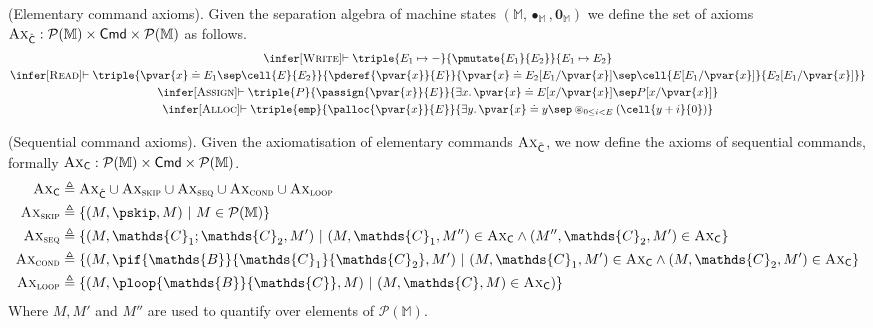 \param (Elementary command axioms). Given the separation algebra of machine states $(\mathbb{M}, \bullet_\mathbb{M}, \mathbf{0}_\mathbb{M})$ we define the set of axioms $\textsc{Ax}_{\hat{\mathsf{C}}} : \mathcal{P}(\mathbb{M}) \times \mathsf{Cmd} \times \mathcal{P}(\mathbb{M})$ as follows.
\begin{gather*}
	\infer[\textsc{Write}]
	{
		\vdash
		\triple
			{E_1 \mapsto -}
			{\pmutate{E_1}{E_2}}
			{E_1 \mapsto E_2}
	}
	{}
	\\
	\infer[\textsc{Read}]
	{
		\vdash
		\triple
			{\pvar{x} \doteq E_1 \sep \cell{E}{E_2}}
			{\pderef{\pvar{x}}{E}}
			{\pvar{x} \doteq E_2[E_1/\pvar{x}] \sep \cell{E[E_1/\pvar{x}]}{E_2[E_1/\pvar{x}]}}
	}
	{}
	\\
	\infer[\textsc{Assign}]
	{
		\vdash
		\triple
			{P}
			{\passign{\pvar{x}}{E}}
			{\exists x \ldotp \pvar{x} \doteq E[x/\pvar{x}] \sep P[x/\pvar{x}]}	
	}
	{}
	\\
	\infer[\textsc{Alloc}]
	{
		\vdash
		\triple
			{\mathtt{emp}}
			{\palloc{\pvar{x}}{E}}
			{\exists y \ldotp \pvar{x} \doteq y \sep \circledast_{0 \leq i < E} \left(\cell{y + i}{0}\right)}
	}
	{}
\end{gather*}

\param (Sequential command axioms). Given the axiomatisation of elementary commands $\textsc{Ax}_{\hat{\mathsf{C}}}$, we now define the axioms of sequential commands, formally $\textsc{Ax}_\mathsf{C} : \mathcal{P}(\mathbb{M}) \times \mathsf{Cmd} \times \mathcal{P}(\mathbb{M})$.
\begin{align*}
	\textsc{Ax}_\mathsf{C} &\triangleq \textsc{Ax}_{\hat{\mathsf{C}}} \cup \textsc{Ax}_{\textsc{skip}} \cup \textsc{Ax}_{\textsc{seq}} \cup \textsc{Ax}_{\textsc{cond}} \cup \textsc{Ax}_{\textsc{loop}}
	\\
	\textsc{Ax}_{\textsc{skip}} &\triangleq \{ (M, \pskip, M)\ |\ M \in \mathcal{P}(\mathbb{M}) \}
	\\
	\textsc{Ax}_{\textsc{seq}} &\triangleq \{ (M, \mathds{C}_1 ; \mathds{C}_2, M')\ |\ (M, \mathds{C}_1, M'') \in \textsc{Ax}_\mathsf{C} \land (M'', \mathds{C}_2, M') \in \textsc{Ax}_\mathsf{C} \}
	\\
	\textsc{Ax}_{\textsc{cond}} &\triangleq \{ (M, \pif{\mathds{B}}{\mathds{C}_1}{\mathds{C}_2}, M')\ |\ (M, \mathds{C}_1, M') \in \textsc{Ax}_\mathsf{C} \land (M, \mathds{C}_2, M') \in \textsc{Ax}_\mathsf{C} \}
	\\
	\textsc{Ax}_{\textsc{loop}} &\triangleq \{ (M, \ploop{\mathds{B}}{\mathds{C}}, M)\ |\ (M, \mathds{C}, M) \in \textsc{Ax}_\mathsf{C}) \}
\end{align*}
Where $M, M'$ and $M''$ are used to quantify over elements of $\mathcal{P}(\mathbb{M})$.

